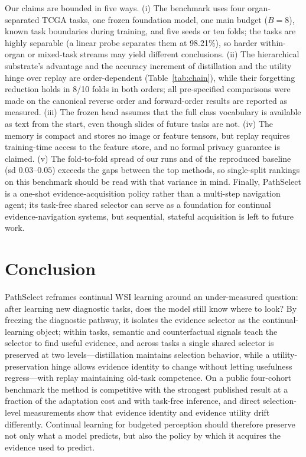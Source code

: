 \documentclass{article}
\begin{document}
Our claims are bounded in five ways. (i) The benchmark uses four organ-separated TCGA tasks, one frozen foundation model, one main budget ($B=8$), known task boundaries during training, and five seeds or ten folds; the tasks are highly separable (a linear probe separates them at 98.21\%), so harder within-organ or mixed-task streams may yield different conclusions. (ii) The hierarchical substrate's advantage and the accuracy increment of distillation and the utility hinge over replay are order-dependent (Table~\ref{tab:chain}), while their forgetting reduction holds in 8/10 folds in both orders; all pre-specified comparisons were made on the canonical reverse order and forward-order results are reported as measured. (iii) The frozen head assumes that the full class vocabulary is available as text from the start, even though slides of future tasks are not. (iv) The memory is compact and stores no image or feature tensors, but replay requires training-time access to the feature store, and no formal privacy guarantee is claimed. (v) The fold-to-fold spread of our runs and of the reproduced baseline (sd $0.03$--$0.05$) exceeds the gaps between the top methods, so single-split rankings on this benchmark should be read with that variance in mind. Finally, PathSelect is a one-shot evidence-acquisition policy rather than a multi-step navigation agent; its task-free shared selector can serve as a foundation for continual evidence-navigation systems, but sequential, stateful acquisition is left to future work.

\section{Conclusion}

PathSelect reframes continual WSI learning around an under-measured question: after learning new diagnostic tasks, does the model still know where to look? By freezing the diagnostic pathway, it isolates the evidence selector as the continual-learning object; within tasks, semantic and counterfactual signals teach the selector to find useful evidence, and across tasks a single shared selector is preserved at two levels---distillation maintains selection behavior, while a utility-preservation hinge allows evidence identity to change without letting usefulness regress---with replay maintaining old-task competence. On a public four-cohort benchmark the method is competitive with the strongest published result at a fraction of the adaptation cost and with task-free inference, and direct selection-level measurements show that evidence identity and evidence utility drift differently. Continual learning for budgeted perception should therefore preserve not only what a model predicts, but also the policy by which it acquires the evidence used to predict.
\end{document}
